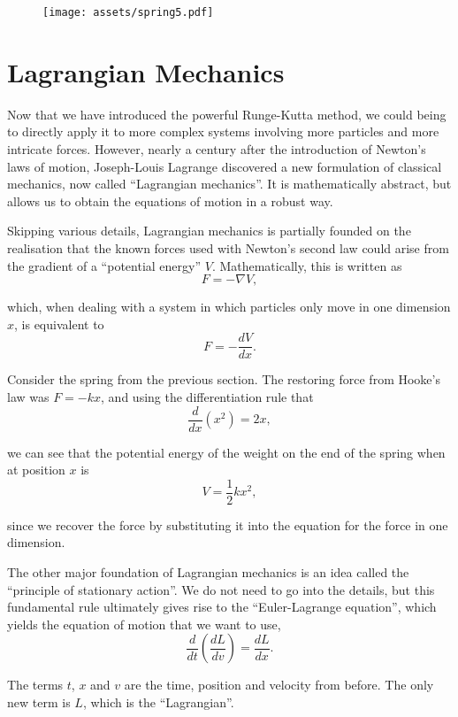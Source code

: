 \documentclass[11pt]{article}
\begin{document}
\begin{figure}[htbp]
\centering
\texttt{[image: assets/spring5.pdf]}
\label{plot:spring5}
\end{figure}
\newpage

\section{Lagrangian Mechanics}

Now that we have introduced the powerful Runge\hyp{}Kutta method, we could being to directly apply it to more complex systems involving more particles and more intricate forces. However, nearly a century after the introduction of Newton's laws of motion, Joseph\hyp{}Louis Lagrange discovered a new formulation of classical mechanics, now called ``Lagrangian mechanics''. It is mathematically abstract, but allows us to obtain the equations of motion in a robust way.
\newline

Skipping various details, Lagrangian mechanics is partially founded on the realisation that the known forces used with Newton's second law could arise from the gradient of a ``potential energy'' $V$. Mathematically, this is written as
$$F=-\nabla V,$$

which, when dealing with a system in which particles only move in one dimension $x$, is equivalent to
$$F=-\frac{dV}{dx}.$$

Consider the spring from the previous section. The restoring force from Hooke's law was $F=-kx$, and using the differentiation rule that
$$\frac{d}{dx}\left(x^2\right)=2x,$$

we can see that the potential energy of the weight on the end of the spring when at position $x$ is
$$V=\frac{1}{2}kx^2,$$

since we recover the force by substituting it into the equation for the force in one dimension.
\newpage

The other major foundation of Lagrangian mechanics is an idea called the ``principle of stationary action''. We do not need to go into the details, but this fundamental rule ultimately gives rise to the ``Euler\hyp{}Lagrange equation'', which yields the equation of motion that we want to use,
$$\frac{d}{dt}\left(\frac{dL}{dv}\right)=\frac{dL}{dx}.$$

The terms $t$, $x$ and $v$ are the time, position and velocity from before. The only new term is $L$, which is the ``Lagrangian''.
\newline
\end{document}
